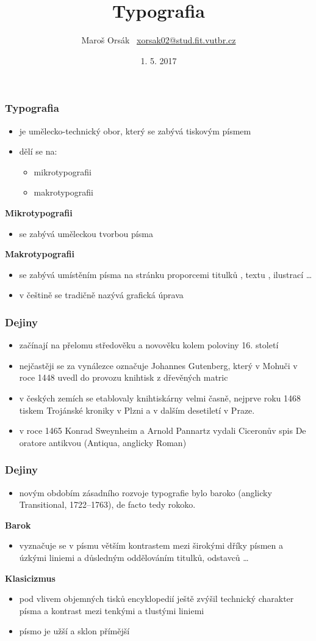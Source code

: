\documentclass{beamer}
\title{Typografia}
\author{\texorpdfstring{Maroš Orsák \ \newline\url{xorsak02@stud.fit.vutbr.cz}}{Author}}
\institute{Vysoké učenie technické v~Brně \\Fakulta informačných technológií}
\date{1. 5. 2017}
\begin{document}
\begin{frame}
\titlepage
\end{frame}

\begin{frame}
\frametitle{Typografia}
\begin{itemize}
\item{je umělecko-technický obor, který se zabývá tiskovým písmem}
\item{dělí se na:}
\begin{itemize}
\item{mikrotypografii}
\item{makrotypografii}
\end{itemize}
\end{itemize}
\textbf{Mikrotypografii}
\begin{itemize}
\item{se zabývá uměleckou tvorbou písma}
\end{itemize}
\textbf{Makrotypografii}
\begin{itemize}
\item{se zabývá umístěním písma na stránku proporcemi titulků , textu , ilustrací \dots}
\item{v češtině se tradičně nazývá grafická úprava}
\end{itemize}
\end{frame}
\begin{frame}
\frametitle{Dejiny}
\begin{itemize}
\item{začínají na přelomu středověku a novověku kolem poloviny 16. století}
\item{nejčastěji se za vynálezce označuje Johannes Gutenberg, který v Mohuči v roce 1448 uvedl do provozu knihtisk z dřevěných matric}
\item{v českých zemích se etablovaly knihtiskárny velmi časně, nejprve roku 1468 tiskem Trojánské kroniky v Plzni a v dalším desetiletí v Praze.}
\item{v roce 1465 Konrad Sweynheim a Arnold Pannartz vydali Ciceronův spis De oratore antikvou (Antiqua, anglicky Roman)}
\end{itemize}
\end{frame}
\begin{frame}
\frametitle{Dejiny}
\begin{itemize}
\item{novým obdobím zásadního rozvoje typografie bylo baroko (anglicky Transitional, 1722–1763), de facto tedy rokoko.}
\end{itemize}
\textbf{Barok}
\begin{itemize}
\item{vyznačuje se v písmu větším kontrastem mezi širokými dříky písmen a úzkými liniemi a důsledným oddělováním titulků, odstavců \dots}
\end{itemize}
\textbf{Klasicizmus}
\begin{itemize}
\item{pod vlivem objemných tisků encyklopedií ještě zvýšil technický charakter písma a kontrast mezi tenkými a tlustými liniemi}
\item{písmo je užší a sklon přímější}
\end{itemize}
\end{frame}
\end{document}
